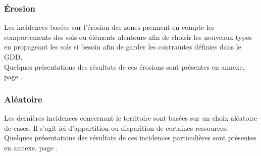 \documentclass[a4paper]{memoir}
\begin{document}
				\subsubsection{\'Erosion}
					Les incidences basées sur l'érosion des zones prennent en compte les comportements des sols ou éléments alentours afin de choisir les nouveaux types en propageant les sols si besoin afin de garder les contraintes définies dans le GDD.\\
					Quelques présentations des résultats de ces érosions sont présentes en annexe, page \pageref{fig:erosion}.
				
				\subsubsection{Aléatoire}
					Les dernières incidences concernant le territoire sont basées sur un choix aléatoire de cases. Il s'agit ici d'appartition ou disparition de certaines ressources.\\
					Quelques présentations des résultats de ces incidences particulières sont présentes en annexe, page \pageref{fig:aleatoire}.
			
\end{document}
